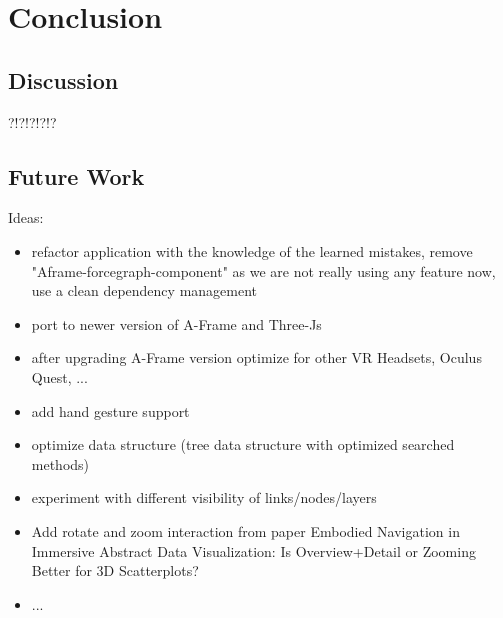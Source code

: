 \chapter{Conclusion}

\section{Discussion}

?!?!?!?!?

\section{Future Work}
Ideas:
\begin{itemize}
    \item refactor application with the knowledge of the learned mistakes, remove "Aframe-forcegraph-component" as we are not really using any feature now, use a clean dependency management
    \item port to newer version of A-Frame and Three-Js
    \item after upgrading A-Frame version optimize for other VR Headsets, Oculus Quest, ... 
    \item add hand gesture support
    \item optimize data structure (tree data structure  with optimized searched methods)
    \item experiment with different visibility of links/nodes/layers
    \item Add rotate and zoom interaction from paper Embodied Navigation in Immersive Abstract Data Visualization:
    Is Overview+Detail or Zooming Better for 3D Scatterplots?
    \item ...
\end{itemize}


